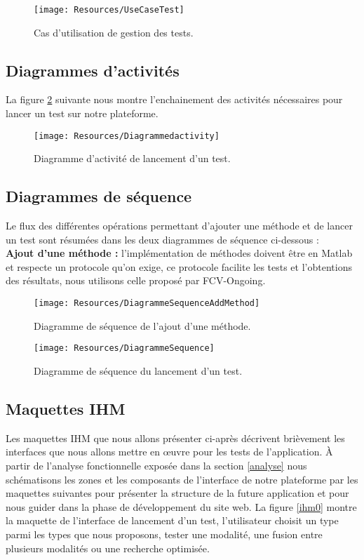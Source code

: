 \begin{figure}[H]
	\centering
	\texttt{[image: Resources/UseCaseTest]}
	
	\caption{Cas d'utilisation de gestion des tests.}
	\label{usecasetest}
\end{figure}
\subsection{Diagrammes d’activités } 
La figure \ref{activitydiagram} suivante nous montre l’enchainement des activités nécessaires pour lancer un test sur notre plateforme.
\begin{landscape}

\begin{figure}[H]
	\centering
	\texttt{[image: Resources/Diagrammedactivity]}
	
	\caption{Diagramme d'activité de lancement d'un test.}
	\label{activitydiagram}
\end{figure}
\end{landscape}

\subsection{Diagrammes de séquence } 
Le flux des différentes opérations permettant d'ajouter une méthode et de lancer un test sont résumées dans les deux diagrammes de séquence ci-dessous :
\\\textbf{ Ajout d'une méthode : } l'implémentation de méthodes doivent être en Matlab et respecte un protocole qu'on exige, ce protocole facilite les tests et l'obtentions des résultats, nous utilisons celle proposé par FCV-Ongoing.

\begin{figure}[H]
	\centering
	\texttt{[image: Resources/DiagrammeSequenceAddMethod]}
	
	\caption{Diagramme de séquence  de l'ajout d'une méthode.}
	\label{activitysueq2}
\end{figure}
\begin{figure}[H]
	\centering
	\texttt{[image: Resources/DiagrammeSequence]}
	
	\caption{Diagramme de séquence  du lancement d'un test.}
	\label{activitysueq}
\end{figure}
\subsection{Maquettes IHM}
Les maquettes IHM que nous allons présenter ci-après décrivent brièvement les interfaces que nous allons mettre en œuvre pour les tests de l’application.
À partir de l'analyse fonctionnelle exposée dans la section \ref{analyse} nous schématisons les zones et les composants de l'interface de notre plateforme par les maquettes suivantes pour présenter la structure de la future application et pour nous guider dans la phase de développement du site web. La figure \ref{ihm0} montre la maquette de l'interface de lancement d'un test, l'utilisateur choisit un type parmi les types que nous proposons, tester une modalité, une fusion entre plusieurs modalités ou une recherche optimisée.



